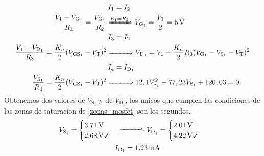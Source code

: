 \documentclass[11pt,a4paper]{article}
\begin{document}
		\begin{align}
			&\hspace{2pt}I_1 = I_2 \\
			\frac{V_1 - V_{\mathrm{G}_1}}{R_1} = \frac{V_{\mathrm{G}_1}}{R_2} &\xRightarrow{R_1 = R_2} V_{\mathrm{G}_1} = \frac{V_1}{2} = \SI{5}{\volt} \\
			&\hspace{2pt}I_3 = I_2 \\
			\frac{V_1 - V_{\mathrm{D}_1}}{R_3} = \frac{K_n}{2}(V_{\mathrm{GS}_1} - V_{\mathrm{T}})^2 &\xRightarrow{\hspace{27pt}} V_{\mathrm{D}_1} = V_1 - \frac{K_n}{2}R_3(V_{\mathrm{G}_1}-V_{\mathrm{S}_1}-V_{\mathrm{T}})^2 \\
			&\hspace{2pt}I_4 = I_{\mathrm{D}_1} \\
			\frac{V_{\mathrm{S}_1}}{R_4} = \frac{K_n}{2}(V_{\mathrm{GS}_1} - V_{\mathrm{T}})^2 &\xRightarrow{\hspace{27pt}} 12,1V_{\mathrm{S}_1}^2 - 77,23V_{\mathrm{S}_1} + 120,03 = 0
		\end{align}
		Obtenemos dos valores de $V_{\mathrm{S}_1}$ y de $V_{\mathrm{D}_1}$, los unicos que cumplen las condiciones de las zonas de saturacion de \ref{zonas_mosfet} son los segundos.
		\begin{align}
			V_{\mathrm{S}_1} =
			\begin{cases}
				\SI{3,71}{\volt} \\
				\SI{2,68}{\volt} \checkmark
			\end{cases}
			&\xRightarrow{\hspace{27pt}}
			V_{\mathrm{D}_1} =
			\begin{cases}
				\SI{2,01}{\volt} \\
				\SI{4,22}{\volt} \checkmark
			\end{cases} \\
			&\hspace{-4pt}I_{\mathrm{D}_1} = \SI{1,23}{\milli\ampere}
		\end{align}
\end{document}
